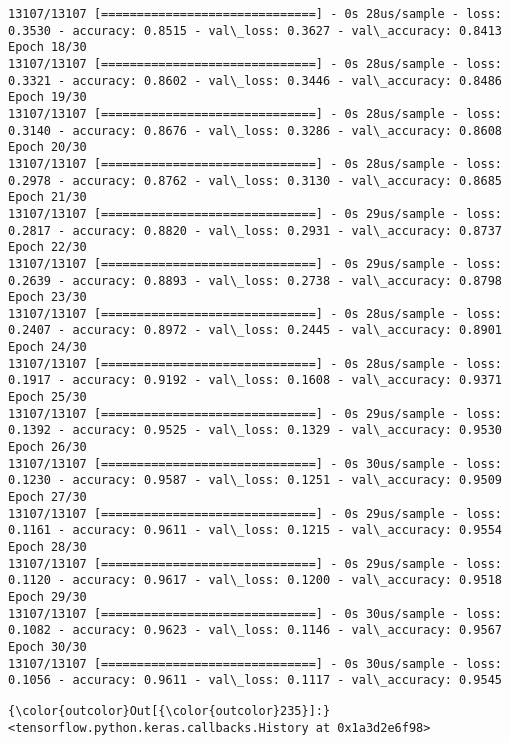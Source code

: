\documentclass[11pt]{article}
\begin{document}
\begin{Verbatim}[commandchars=\\\{\}]
13107/13107 [==============================] - 0s 28us/sample - loss: 0.3530 - accuracy: 0.8515 - val\_loss: 0.3627 - val\_accuracy: 0.8413
Epoch 18/30
13107/13107 [==============================] - 0s 28us/sample - loss: 0.3321 - accuracy: 0.8602 - val\_loss: 0.3446 - val\_accuracy: 0.8486
Epoch 19/30
13107/13107 [==============================] - 0s 28us/sample - loss: 0.3140 - accuracy: 0.8676 - val\_loss: 0.3286 - val\_accuracy: 0.8608
Epoch 20/30
13107/13107 [==============================] - 0s 28us/sample - loss: 0.2978 - accuracy: 0.8762 - val\_loss: 0.3130 - val\_accuracy: 0.8685
Epoch 21/30
13107/13107 [==============================] - 0s 29us/sample - loss: 0.2817 - accuracy: 0.8820 - val\_loss: 0.2931 - val\_accuracy: 0.8737
Epoch 22/30
13107/13107 [==============================] - 0s 29us/sample - loss: 0.2639 - accuracy: 0.8893 - val\_loss: 0.2738 - val\_accuracy: 0.8798
Epoch 23/30
13107/13107 [==============================] - 0s 28us/sample - loss: 0.2407 - accuracy: 0.8972 - val\_loss: 0.2445 - val\_accuracy: 0.8901
Epoch 24/30
13107/13107 [==============================] - 0s 28us/sample - loss: 0.1917 - accuracy: 0.9192 - val\_loss: 0.1608 - val\_accuracy: 0.9371
Epoch 25/30
13107/13107 [==============================] - 0s 29us/sample - loss: 0.1392 - accuracy: 0.9525 - val\_loss: 0.1329 - val\_accuracy: 0.9530
Epoch 26/30
13107/13107 [==============================] - 0s 30us/sample - loss: 0.1230 - accuracy: 0.9587 - val\_loss: 0.1251 - val\_accuracy: 0.9509
Epoch 27/30
13107/13107 [==============================] - 0s 29us/sample - loss: 0.1161 - accuracy: 0.9611 - val\_loss: 0.1215 - val\_accuracy: 0.9554
Epoch 28/30
13107/13107 [==============================] - 0s 29us/sample - loss: 0.1120 - accuracy: 0.9617 - val\_loss: 0.1200 - val\_accuracy: 0.9518
Epoch 29/30
13107/13107 [==============================] - 0s 30us/sample - loss: 0.1082 - accuracy: 0.9623 - val\_loss: 0.1146 - val\_accuracy: 0.9567
Epoch 30/30
13107/13107 [==============================] - 0s 30us/sample - loss: 0.1056 - accuracy: 0.9611 - val\_loss: 0.1117 - val\_accuracy: 0.9545

    \end{Verbatim}

\begin{Verbatim}[commandchars=\\\{\}]
{\color{outcolor}Out[{\color{outcolor}235}]:} <tensorflow.python.keras.callbacks.History at 0x1a3d2e6f98>
\end{Verbatim}
            
\end{document}
